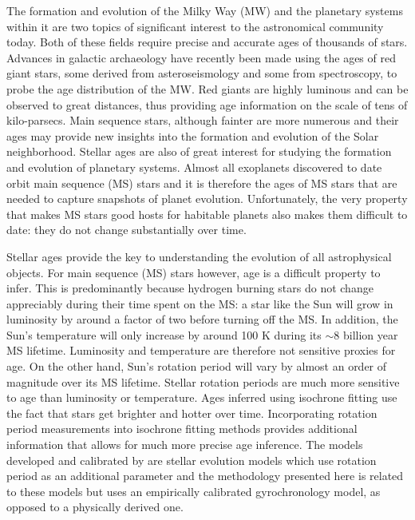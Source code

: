 

The formation and evolution of the Milky Way (MW) and the planetary systems
within it are two topics of significant interest to the astronomical community
today.
Both of these fields require precise and accurate ages of thousands of stars.
Advances in galactic archaeology have recently been made using the ages of
red giant stars, some derived from asteroseismology and some from
spectroscopy, to probe the age distribution of the MW.
Red giants are highly luminous and can be observed to great distances, thus
providing age information on the scale of tens of kilo-parsecs.
Main sequence stars, although fainter are more numerous and their ages may
provide new insights into the formation and evolution of the Solar
neighborhood.
Stellar ages are also of great interest for studying the formation and
evolution of planetary systems.
Almost all exoplanets discovered to date orbit main sequence (MS) stars and it
is therefore the ages of MS stars that are needed to capture snapshots of
planet evolution.
Unfortunately, the very property that makes MS stars good hosts for habitable
planets also makes them difficult to date: they do not change substantially
over time.

Stellar ages provide the key to understanding the evolution of all
astrophysical objects.
For main sequence (MS) stars however, age is a difficult property to infer.
This is predominantly because hydrogen burning stars do not change appreciably
during their time spent on the MS: a star like the Sun will grow in
luminosity by around a factor of two before turning off the MS.
In addition, the Sun's temperature will only increase by around 100 K during
its $\sim$8 billion year MS lifetime.
Luminosity and temperature are therefore not sensitive proxies for age.
On the other hand, Sun's rotation period will vary by almost an order of
magnitude over its MS lifetime.
Stellar rotation periods are much more sensitive to age than luminosity or
temperature.
Ages inferred using isochrone fitting use the fact that stars get brighter and
hotter over time.
Incorporating rotation period measurements into isochrone fitting methods
provides additional information that allows for much more precise age
inference.
The models developed and calibrated by \citet{epstein2014, vansaders2015,
vansaders2016} are stellar evolution models which use rotation period as an
additional parameter and the methodology presented here is related to these
models but uses an empirically calibrated gyrochronology model, as opposed to
a physically derived one.


